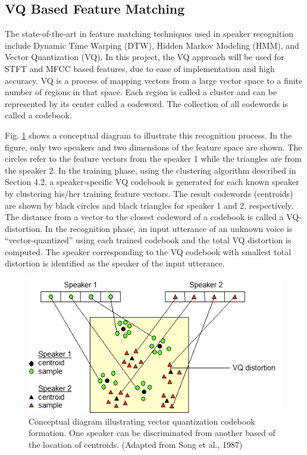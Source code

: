 \documentclass{article}
\begin{document}
\subsection{VQ Based Feature Matching}
The state-of-the-art in feature matching techniques used in speaker recognition include Dynamic Time Warping (DTW), Hidden Markov Modeling (HMM), and Vector Quantization (VQ).  In this project, the VQ approach will be used for STFT and MFCC based features, due to ease of implementation and high accuracy. VQ is a process of mapping vectors from a large vector space to a finite number of regions in that space.  Each region is called a cluster and can be represented by its center called a codeword.  The collection of all codewords is called a codebook. 

Fig. \ref{fig:VQ} shows a conceptual diagram to illustrate this recognition process.  In the figure, only two speakers and two dimensions of the feature space are shown.  The circles refer to the feature vectors from the speaker 1 while the triangles are from the speaker 2.  In the training phase, using the clustering algorithm described in Section 4.2,  a speaker-specific VQ codebook is generated for each known speaker by clustering his/her training feature vectors.  The result codewords (centroids) are shown by black circles and black triangles for speaker 1 and 2, respectively.  The distance from a vector to the closest codeword of a codebook is called a VQ-distortion.  In the recognition phase, an input utterance of an unknown voice is “vector-quantized” using each trained codebook and the total VQ distortion is computed.  The speaker corresponding to the VQ codebook with smallest total distortion is identified as the speaker of the input utterance. 

\begin{figure}[htb]
    \centering
    \includegraphics[width=.8\textwidth]{Picture3.png}
    \caption{Conceptual diagram illustrating vector quantization codebook formation. One speaker can be discriminated from another based of the location of centroids. (Adapted from Song et al., 1987)
    }
    \label{fig:VQ}
\end{figure}
\end{document}
